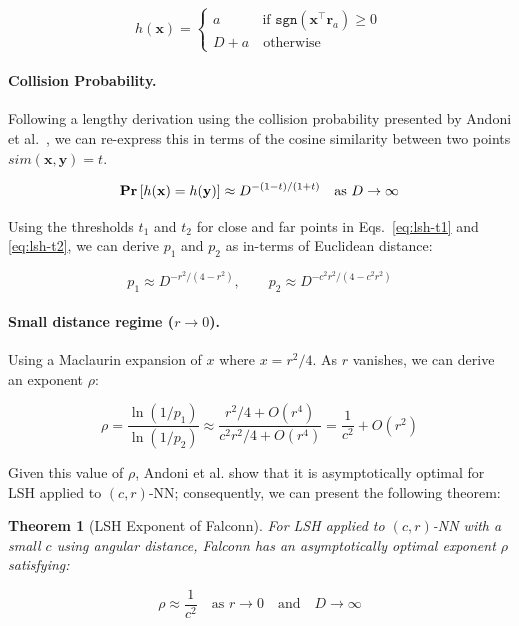 \documentclass{article}
\newcommand{\bx}{\mathbf{x}}
\newcommand{\by}{\mathbf{y}}
\newcommand{\br}{\mathbf{r}}
\renewcommand{\Pr}[1]{\textrm{\bf Pr}\left[#1\right]}
\newcommand{\crNN}{$(c, r)$-NN\xspace}
\newcommand{\sgn}{\texttt{sgn}}
\newcommand{\dotxr}{\bx^\top \br}
\newtheorem{theorem}{Theorem}[section]
\begin{document}
\begin{equation}
    \label{eq:falconnhash}
    h(\bx) = \begin{cases}
    a \qquad \quad \text{if } \sgn(\dotxr_a) \geq 0 \, \\
    D + a \quad \text{otherwise}
    \end{cases}
\end{equation}

\paragraph{Collision Probability.} Following a lengthy derivation using the collision probability presented by Andoni et al.~\cite{andoni2015practical}, we can re-express this in terms of the cosine similarity between two points $sim(\bx, \by) = t$.

\[
\Pr{h(\bx)=h(\by)}
\approx
D^{-(1-t)/(1+t)}
\quad \text{as } D \to \infty
\]

Using the thresholds $t_1$ and $t_2$ for close and far points in Eqs.~\ref{eq:lsh-t1} and \ref{eq:lsh-t2}, we can derive $p_1$ and $p_2$ as in-terms of Euclidean distance:

\[
p_1 \approx D^{-r^2/(4-r^2)},
\qquad
p_2 \approx D^{-c^2 r^2/(4-c^2 r^2)}
\]

\newpage 

\paragraph{Small distance regime ($r\to0$).} Using a Maclaurin expansion of $x$ where $x = r^2/4$. As $r$ vanishes, we can derive an exponent $\rho$: 



\[
\rho
=
\frac{\ln(1/p_1)}{\ln(1/p_2)} \approx 
\frac{r^2/4 + O(r^4)}{c^2 r^2/4 + O(r^4)}
= 
\frac{1}{c^2}+O(r^2)
\]

\medskip

Given this value of $\rho$, Andoni et al. show that it is asymptotically optimal for LSH applied to \crNN; consequently, we can present the following theorem:

\begin{theorem}[LSH Exponent of Falconn]
For LSH applied to \crNN with a small $c$ using angular distance, Falconn has an asymptotically optimal exponent $\rho$ satisfying:

\[
\rho \approx \frac{1}{c^2} \quad\text{as } r \to 0 \quad \text{and} \quad D \to \infty
\]

\end{theorem}
\end{document}
